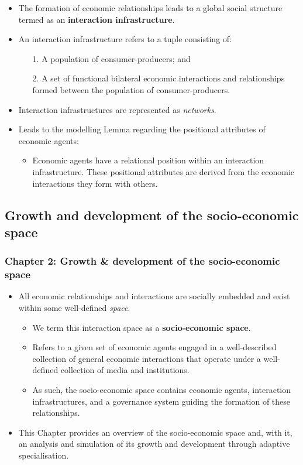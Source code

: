 \documentclass[10pt]{beamer}
\begin{document}
\begin{frame} %
\begin{itemize}
\item The formation of economic relationships leads to a global social structure termed as an \textbf{interaction infrastructure}.
\medskip
\item An interaction infrastructure refers to a tuple consisting of:
\begin{itemize}
\medskip
\item[1.] A population of consumer-producers; and
\medskip
\item[2.] A set of functional bilateral economic interactions and relationships formed between the population of consumer-producers.
\end{itemize}
\medskip
\item Interaction infrastructures are represented as \emph{networks}.
\medskip
\item Leads to the modelling Lemma regarding the positional attributes of economic agents:
\begin{itemize}
\medskip
\item Economic agents have a relational position within an interaction infrastructure. These positional attributes are derived from the economic interactions they form with others.
\end{itemize}
\end{itemize}
\end{frame}

\subsection{Growth and development of the socio-economic space}

\begin{frame} \frametitle{Chapter 2: Growth \& development of the socio-economic space}
\begin{itemize}
\item All economic relationships and interactions are socially embedded and exist within some well-defined \emph{space}.
\begin{itemize}
\medskip
\item We term this interaction space as a \textbf{socio-economic space}.
\medskip
\item Refers to a given set of economic agents engaged in a well-described collection of general economic interactions that operate under a well-defined collection of media and institutions.
\medskip
\item As such, the socio-economic space contains economic agents, interaction infrastructures, and a governance system guiding the formation of these relationships.
\end{itemize}
\medskip
\item This Chapter provides an overview of the socio-economic space and, with it, an analysis and simulation of its growth and development through adaptive specialisation.
\end{itemize}
\end{frame}
\end{document}
